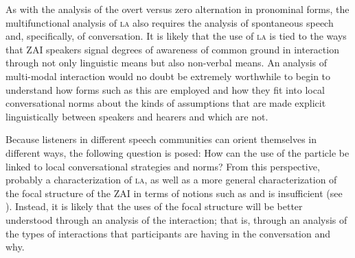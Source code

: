 As with the analysis of the overt versus zero alternation in  pronominal forms, the multifunctional analysis of \textsc{la} also requires the analysis of spontaneous speech and, specifically, of conversation. It is likely that the use of \textsc{la} is tied to the ways that ZAI speakers signal degrees of awareness of common ground in interaction through not only linguistic means but also non-verbal means. An analysis of multi-modal interaction would no doubt be extremely worthwhile to begin to understand how forms such as this are employed and how they fit into local conversational norms about the kinds of assumptions that are made explicit linguistically between speakers and hearers and which are not. 

Because listeners in different speech communities can orient themselves in different ways, the following question is posed: How can the use of the particle be linked to local conversational strategies and norms? From this perspective, probably a characterization of \textsc{la}, as well as a more general characterization of the focal structure of the ZAI in terms of notions such as  and  is insufficient (see \citealt{matic2013,ozerov2015}). Instead, it is likely that the uses of the focal structure will be better understood through an analysis of the interaction; that is, through an analysis of the types of interactions that participants are having in the conversation and why.











